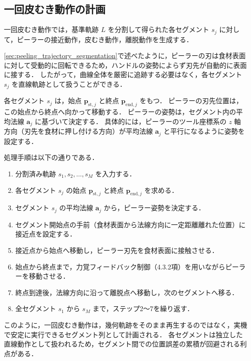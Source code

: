 \subsection{一回皮むき動作の計画}
\label{sec:peeling_one_peel_motion}

一回皮むき動作では，基準軌跡 $L$ を分割して得られた各セグメント $s_j$ に対して，ピーラーの接近動作，皮むき動作，離脱動作を生成する．

\ref{sec:peeling_trajectory_segmentation}で述べたように，ピーラーの刃は食材表面に対して受動的に回転できるため，ハンドルの姿勢によらず刃先が自動的に表面に接する．
したがって，曲線全体を厳密に追跡する必要はなく，各セグメント $s_j$ を直線軌跡として扱うことができる．

各セグメント $s_j$ は，始点 $\mathbf{p}_{\mathrm{st},j}$ と終点 $\mathbf{p}_{\mathrm{end},j}$ をもつ．
ピーラーの刃先位置は，この始点から終点へ向かって移動する．
ピーラーの姿勢は，セグメント内の平均法線 $\mathbf{a}_j$ に基づいて決定する．
具体的には，ピーラーのツール座標系の $z$ 軸方向（刃先を食材に押し付ける方向）が平均法線 $\mathbf{a}_j$ と平行になるように姿勢を設定する．

処理手順は以下の通りである．

\begin{enumerate}
  \item 分割済み軌跡 $s_1, s_2, \ldots, s_M$ を入力する．
  \item 各セグメント $s_j$ の始点 $\mathbf{p}_{\mathrm{st},j}$ と終点 $\mathbf{p}_{\mathrm{end},j}$ を求める．
  \item セグメント $s_j$ の平均法線 $\mathbf{a}_j$ から，ピーラー姿勢を決定する．
  \item セグメント開始点の手前（食材表面から法線方向に一定距離離れた位置）に接近点を設定する．
  \item 接近点から始点へ移動し，ピーラー刃先を食材表面に接触させる．
  \item 始点から終点まで，力覚フィードバック制御（4.3.2項）を用いながらピーラーを移動させる．
  \item 終点到達後，法線方向に沿って離脱点へ移動し，次のセグメントへ移る．
  \item 全セグメント $s_1$ から $s_M$ まで，ステップ2〜7を繰り返す．
\end{enumerate}

このように，一回皮むき動作は，幾何軌跡をそのまま再生するのではなく，実機で安定に実行できるセグメント列として計画される．
各セグメントは独立した直線動作として扱われるため，セグメント間での位置誤差の累積が回避される利点がある．

